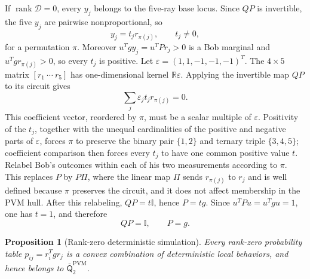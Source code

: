 \documentclass[11pt]{article}
\newtheorem{proposition}[theorem]{Proposition}
\theoremstyle{definition}
\newcommand{\rank}{\operatorname{rank}}
\newcommand{\id}{\mathbb I}
\newcommand{\R}{\mathbb R}
\newcommand{\Qbar}{\overline{\mathsf Q}}
\newcommand{\PVM}{\mathrm{PVM}}
\newcommand{\cD}{\mathcal D}
\begin{document}
If \(\rank\cD=0\), every \(y_j\) belongs to the five-ray base locus.
Since \(QP\) is invertible, the five \(y_j\) are pairwise nonproportional, so
\[
y_j=t_jr_{\pi(j)},\qquad t_j\ne0,
\]
for a permutation \(\pi\). Moreover \(u^Tgy_j=u^TPr_j>0\) is a Bob marginal
and \(u^Tgr_{\pi(j)}>0\), so every \(t_j\) is positive. Let
\(\varepsilon=(1,1,-1,-1,-1)^T\). The \(4\times5\) matrix
\([r_1\ \cdots\ r_5]\) has one-dimensional kernel
\(\R\varepsilon\). Applying the invertible map \(QP\) to its circuit gives
\[
\sum_j\varepsilon_jt_jr_{\pi(j)}=0.
\]
This coefficient vector, reordered by \(\pi\), must be a scalar multiple of
\(\varepsilon\). Positivity of the \(t_j\), together with the unequal
cardinalities of the positive and negative parts of \(\varepsilon\), forces
\(\pi\) to preserve the binary pair \(\{1,2\}\) and ternary triple
\(\{3,4,5\}\); coefficient comparison then forces every \(t_j\) to have one
common positive value \(t\). Relabel Bob's outcomes within each of his two
measurements according to \(\pi\). This replaces \(P\) by \(P\Pi\), where
the linear map \(\Pi\) sends \(r_{\pi(j)}\) to \(r_j\) and is well defined
because \(\pi\) preserves the circuit, and it does not affect membership in
the PVM hull. After this relabeling, \(QP=t\id\), hence \(P=tg\).
Since \(u^TPu=u^Tgu=1\), one has \(t=1\), and therefore
\[
QP=\id,\qquad P=g.
\]

\begin{proposition}[Rank-zero deterministic simulation]
\label{prop:rank-zero}
Every rank-zero probability table \(p_{ij}=r_i^Tgr_j\) is a convex
combination of deterministic local behaviors, and hence belongs to
\(\Qbar^{\PVM}_2\).
\end{proposition}
\end{document}
